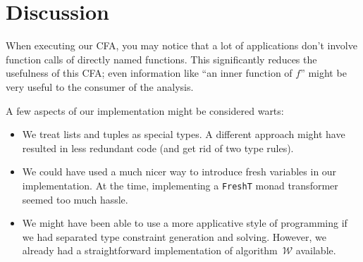 \documentclass[a4paper]{scrartcl}
\newcommand{\algow}{algorithm~$\mathcal{W}$}
\begin{document}
\section{Discussion}
When executing our CFA, you may notice that a lot of applications don't involve
function calls of directly named functions. This significantly reduces the
usefulness of this CFA; even information like ``an inner function of $f$''
might be very useful to the consumer of the analysis.

A few aspects of our implementation might be considered warts:
\begin{itemize}
\item
    We treat lists and tuples as special types. A different approach might
    have resulted in less redundant code (and get rid of two type rules).
\item
    We could have used a much nicer way to introduce fresh variables in our
    implementation. At the time, implementing a \texttt{FreshT} monad
    transformer seemed too much hassle.
\item
    We might have been able to use a more applicative style of programming
    if we had separated type constraint generation and solving. However,
    we already had a straightforward implementation of \algow{} available.
\end{itemize}
\end{document}
